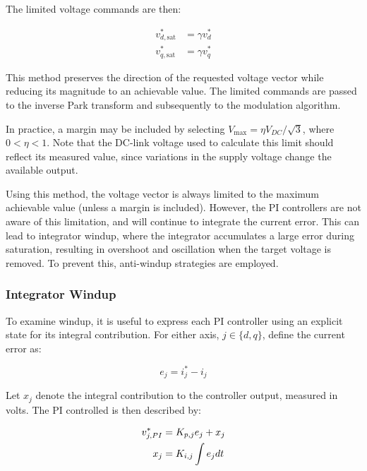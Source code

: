 \documentclass{article}
\begin{document}
The limited voltage commands are then:

\begin{align}
    v_{d,\mathrm{sat}}^* &= \gamma v_d^* \\
    v_{q,\mathrm{sat}}^* &= \gamma v_q^*
\end{align}

This method preserves the direction of the requested voltage vector while reducing its magnitude to an achievable value. The limited commands are passed to the inverse Park transform and subsequently to the modulation algorithm.

In practice, a margin may be included by selecting $V_{\max} = \eta V_{DC}/\sqrt{3}$, where $0 < \eta < 1$. Note that the DC-link voltage used to calculate this limit should reflect its measured value, since variations in the supply voltage change the available output.

Using this method, the voltage vector is always limited to the maximum achievable value (unless a margin is included). However, the PI controllers are not aware of this limitation, and will continue to integrate the current error. This can lead to integrator windup, where the integrator accumulates a large error during saturation, resulting in overshoot and oscillation when the target voltage is removed. To prevent this, anti-windup strategies are employed. 


\subsubsection{Integrator Windup}
\label{sec:integrator-windup}

To examine windup, it is useful to express each PI controller using an explicit state for its integral contribution. For either axis, $j \in \{d,q\}$, define the current error as:

\begin{equation}
    e_j = i_j^* - i_j
\end{equation}

Let $x_j$ denote the integral contribution to the controller output, measured in volts. The PI controlled is then described by:

\begin{align}
    v_{j,PI}^* &= K_{p,j}e_j + x_j \\
    x_j &= K_{i,j}\int e_j \space dt
\end{align}
\end{document}
